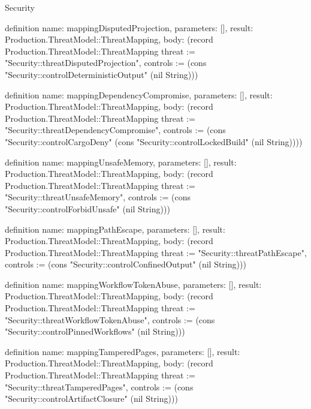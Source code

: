 \begin{lexlean}{Security}
\begin{semanticmodule}
{{definition{
  name: mappingDisputedProjection,
  parameters: [],
  result: Production.ThreatModel::ThreatMapping,
  body: (record Production.ThreatModel::ThreatMapping {threat := "Security::threatDisputedProjection", controls := (cons "Security::controlDeterministicOutput" (nil String))})
}

definition{
  name: mappingDependencyCompromise,
  parameters: [],
  result: Production.ThreatModel::ThreatMapping,
  body: (record Production.ThreatModel::ThreatMapping {threat := "Security::threatDependencyCompromise", controls := (cons "Security::controlCargoDeny" (cons "Security::controlLockedBuild" (nil String)))})
}

definition{
  name: mappingUnsafeMemory,
  parameters: [],
  result: Production.ThreatModel::ThreatMapping,
  body: (record Production.ThreatModel::ThreatMapping {threat := "Security::threatUnsafeMemory", controls := (cons "Security::controlForbidUnsafe" (nil String))})
}

definition{
  name: mappingPathEscape,
  parameters: [],
  result: Production.ThreatModel::ThreatMapping,
  body: (record Production.ThreatModel::ThreatMapping {threat := "Security::threatPathEscape", controls := (cons "Security::controlConfinedOutput" (nil String))})
}

definition{
  name: mappingWorkflowTokenAbuse,
  parameters: [],
  result: Production.ThreatModel::ThreatMapping,
  body: (record Production.ThreatModel::ThreatMapping {threat := "Security::threatWorkflowTokenAbuse", controls := (cons "Security::controlPinnedWorkflows" (nil String))})
}

definition{
  name: mappingTamperedPages,
  parameters: [],
  result: Production.ThreatModel::ThreatMapping,
  body: (record Production.ThreatModel::ThreatMapping {threat := "Security::threatTamperedPages", controls := (cons "Security::controlArtifactClosure" (nil String))})
}

}}
\end{semanticmodule}
\end{lexlean}
